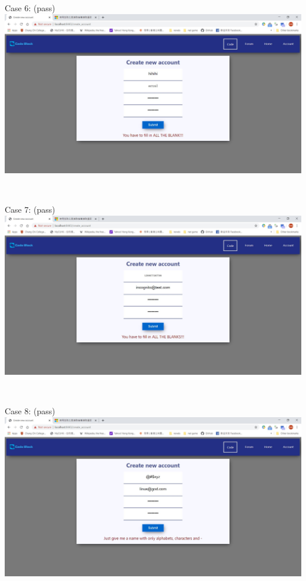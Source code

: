 Case 6: (pass)\\
\includegraphics[scale=0.45]{Doc/Pics/case-5-1-6}

~

Case 7: (pass)\\
\includegraphics[scale=0.45]{Doc/Pics/case-5-1-7}

~

Case 8: (pass)\\
\includegraphics[scale=0.45]{Doc/Pics/case-5-1-8}

~

